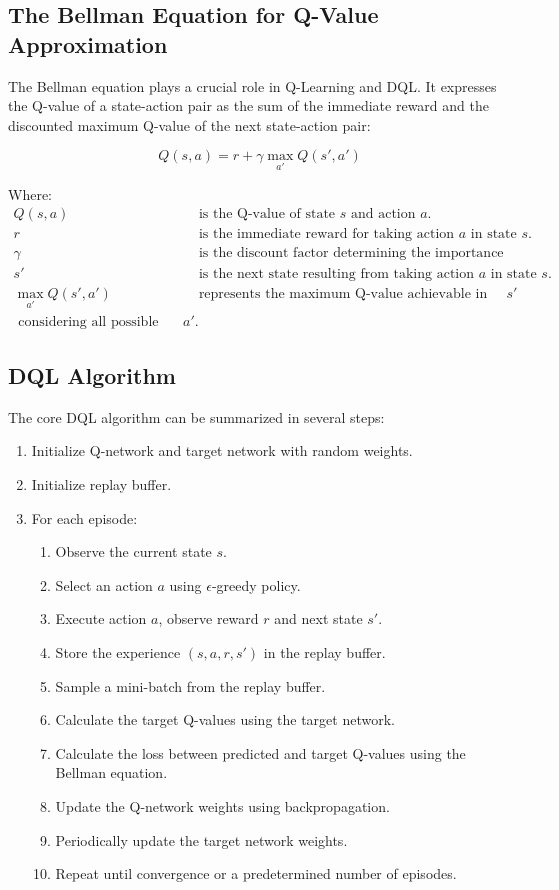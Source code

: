 \documentclass{scrartcl}
\begin{document}
\subsection{The Bellman Equation for Q-Value Approximation}

The Bellman equation plays a crucial role in Q-Learning and DQL. It expresses the Q-value of a state-action pair as the sum of the immediate reward and the discounted maximum Q-value of the next state-action pair:

\[
Q(s, a) = r + \gamma \max_{a'} Q(s', a')
\]

Where:
\begin{align*}
Q(s, a) & \text{ is the Q-value of state }s\text{ and action }a. \\
r & \text{ is the immediate reward for taking action }a\text{ in state }s. \\
\gamma & \text{ is the discount factor determining the importance of future rewards.} \\
s' & \text{ is the next state resulting from taking action }a\text{ in state }s. \\
\max_{a'} Q(s', a') & \text{ represents the maximum Q-value achievable in the next state }s' \\
\text{ considering all possible actions }a'.
\end{align*}

\subsection{DQL Algorithm}

The core DQL algorithm can be summarized in several steps:

\begin{enumerate}
\item Initialize Q-network and target network with random weights.
\item Initialize replay buffer.
\item For each episode:
   \begin{enumerate}
   \item Observe the current state $s$.
   \item Select an action $a$ using $\epsilon$-greedy policy.
   \item Execute action $a$, observe reward $r$ and next state $s'$.
   \item Store the experience $(s, a, r, s')$ in the replay buffer.
   \item Sample a mini-batch from the replay buffer.
   \item Calculate the target Q-values using the target network.
   \item Calculate the loss between predicted and target Q-values using the Bellman equation.
   \item Update the Q-network weights using backpropagation.
   \item Periodically update the target network weights.
   \item Repeat until convergence or a predetermined number of episodes.
   \end{enumerate}
\end{enumerate}
\end{document}
